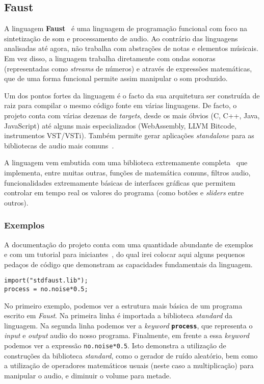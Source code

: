 \subsection{Faust}
A linguagem \textbf{Faust}~\cite{faust} é uma linguagem de programação funcional com foco na sintetização de som e processamento de audio. Ao contrário das linguagens analisadas até agora, não trabalha com abstrações de notas e elementos músicais. Em vez disso, a linguagem trabalha diretamente com ondas sonoras (representadas como \textit{streams} de números) e através de expressões matemáticas, que de uma forma funcional permite assim manipular o som produzido.

Um dos pontos fortes da linguagem é o facto da sua arquitetura ser construída de raiz para compilar o mesmo código fonte em várias linguagens. De facto, o projeto conta com várias dezenas de \textit{targets}, desde os mais óbvios (C, C++, Java, JavaScript) até alguns mais especializados (WebAssembly, LLVM Bitcode, instrumentos VST/VSTi). Também permite gerar aplicações \textit{standalone} para as bibliotecas de audio mais comuns~\cite{faust-targets}.
	
A linguagem vem embutida com uma biblioteca extremamente completa~\cite{faust-libraries} que implementa, entre muitas outras, funções de matemática comuns, filtros audio, funcionalidades extremamente básicas de interfaces gráficas que permitem controlar em tempo real os valores do programa (como botões e \textit{sliders} entre outros).
	
\subsubsection{Exemplos}
A documentação do projeto conta com uma quantidade abundante de exemplos~\cite{faust-examples} e com um tutorial para iniciantes~\cite{faust-quickstart}, do qual irei colocar aqui alguns pequenos pedaços de código que demonstram as capacidades fundamentais da linguagem.

\begin{lstlisting}[caption={Geração de ruído aleatório com volume a metade},captionpos=b]
import("stdfaust.lib");
process = no.noise*0.5;
\end{lstlisting}

No primeiro exemplo, podemos ver a estrutura mais básica de um programa escrito em \textit{Faust}. Na primeira linha é importada a biblioteca \textit{standard} da linguagem. Na segunda linha podemos ver a \textit{keyword} \textbf{\texttt{process}}, que representa o \textit{input} e \textit{output} audio do nosso programa. Finalmente, em frente a essa \textit{keyword} podemos ver a expressão \texttt{no.noise*0.5}. Isto demonstra a utilização de construções da biblioteca \textit{standard}, como o gerador de ruído aleatório, bem como a utilização de operadores matemáticos usuais (neste caso a multiplicação) para manipular o audio, e diminuir o volume para metade.

